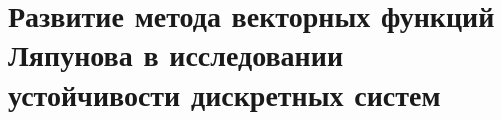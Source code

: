 \section{Развитие метода векторных функций Ляпунова в исследовании устойчивости дискретных систем} \label{p12}